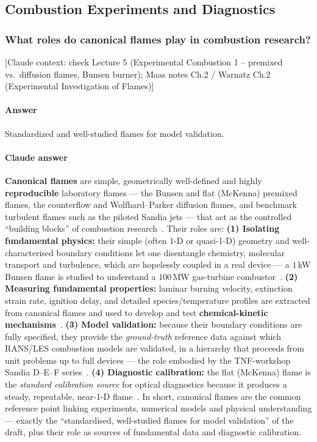 \subsection{Combustion Experiments and Diagnostics}

\subsubsection{What roles do canonical flames play in combustion research?}

{\color{gray}\footnotesize [Claude context: check Lecture 5 (Experimental Combustion 1 -- premixed vs.\ diffusion flames, Bunsen burner); Maas notes Ch.2 / Warnatz Ch.2 (Experimental Investigation of Flames)]}

\paragraph{Answer} Standardized and well-studied flames for model validation.

{\color{istblue}
\paragraph{Claude answer}
\textbf{Canonical flames} are simple, geometrically well-defined and highly \textbf{reproducible} laboratory flames --- the Bunsen and flat (McKenna) premixed flames, the counterflow and Wolfhard--Parker diffusion flames, and benchmark turbulent flames such as the piloted Sandia jets --- that act as the controlled ``building blocks'' of combustion research~\cite{lecture5,warnatz2006combustion,mishra2014experimental}. Their roles are: \textbf{(1) Isolating fundamental physics:} their simple (often 1-D or quasi-1-D) geometry and well-characterised boundary conditions let one disentangle chemistry, molecular transport and turbulence, which are hopelessly coupled in a real device --- a $1$\,kW Bunsen flame is studied to understand a $100$\,MW gas-turbine combustor~\cite{lecture5}. \textbf{(2) Measuring fundamental properties:} laminar burning velocity, extinction strain rate, ignition delay, and detailed species/temperature profiles are extracted from canonical flames and used to develop and test \textbf{chemical-kinetic mechanisms}~\cite{warnatz2006combustion,mishra2014experimental}. \textbf{(3) Model validation:} because their boundary conditions are fully specified, they provide the \emph{ground-truth} reference data against which RANS/LES combustion models are validated, in a hierarchy that proceeds from unit problems up to full devices --- the role embodied by the TNF-workshop Sandia D--E--F series~\cite{barlowfrank1998sandia,lecture10}. \textbf{(4) Diagnostic calibration:} the flat (McKenna) flame is the \emph{standard calibration source} for optical diagnostics because it produces a steady, repeatable, near-1-D flame~\cite{lecture5}. In short, canonical flames are the common reference point linking experiments, numerical models and physical understanding --- exactly the ``standardised, well-studied flames for model validation'' of the draft, plus their role as sources of fundamental data and diagnostic calibration.
}




